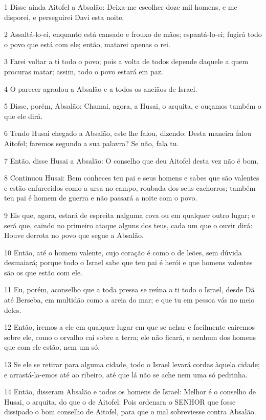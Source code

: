 \par 1 Disse ainda Aitofel a Absalão: Deixa-me escolher doze mil homens, e me disporei, e perseguirei Davi esta noite.
\par 2 Assaltá-lo-ei, enquanto está cansado e frouxo de mãos; espantá-lo-ei; fugirá todo o povo que está com ele; então, matarei apenas o rei.
\par 3 Farei voltar a ti todo o povo; pois a volta de todos depende daquele a quem procuras matar; assim, todo o povo estará em paz.
\par 4 O parecer agradou a Absalão e a todos os anciãos de Israel.
\par 5 Disse, porém, Absalão: Chamai, agora, a Husai, o arquita, e ouçamos também o que ele dirá.
\par 6 Tendo Husai chegado a Absalão, este lhe falou, dizendo: Desta maneira falou Aitofel; faremos segundo a sua palavra? Se não, fala tu.
\par 7 Então, disse Husai a Absalão: O conselho que deu Aitofel desta vez não é bom.
\par 8 Continuou Husai: Bem conheces teu pai e seus homens e sabes que são valentes e estão enfurecidos como a ursa no campo, roubada dos seus cachorros; também teu pai é homem de guerra e não passará a noite com o povo.
\par 9 Eis que, agora, estará de espreita nalguma cova ou em qualquer outro lugar; e será que, caindo no primeiro ataque alguns dos teus, cada um que o ouvir dirá: Houve derrota no povo que segue a Absalão.
\par 10 Então, até o homem valente, cujo coração é como o de leões, sem dúvida desmaiará; porque todo o Israel sabe que teu pai é herói e que homens valentes são os que estão com ele.
\par 11 Eu, porém, aconselho que a toda pressa se reúna a ti todo o Israel, desde Dã até Berseba, em multidão como a areia do mar; e que tu em pessoa vás no meio deles.
\par 12 Então, iremos a ele em qualquer lugar em que se achar e facilmente cairemos sobre ele, como o orvalho cai sobre a terra; ele não ficará, e nenhum dos homens que com ele estão, nem um só.
\par 13 Se ele se retirar para alguma cidade, todo o Israel levará cordas àquela cidade; e arrastá-la-emos até ao ribeiro, até que lá não se ache nem uma só pedrinha.
\par 14 Então, disseram Absalão e todos os homens de Israel: Melhor é o conselho de Husai, o arquita, do que o de Aitofel. Pois ordenara o SENHOR que fosse dissipado o bom conselho de Aitofel, para que o mal sobreviesse contra Absalão.
